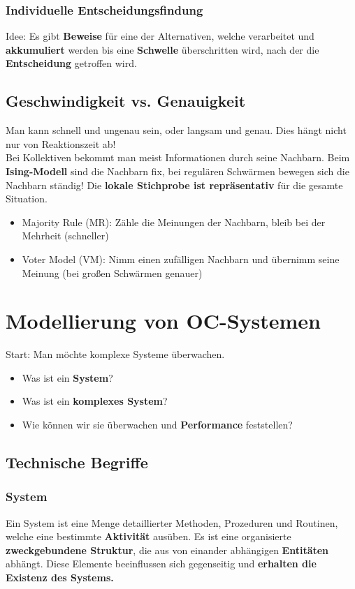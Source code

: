 \documentclass[a4paper]{article}
\begin{document}
\subsubsection{Individuelle Entscheidungsfindung}
Idee: Es gibt \textbf{Beweise} für eine der Alternativen, welche verarbeitet und \textbf{akkumuliert} werden bis eine \textbf{Schwelle} überschritten wird, nach der die \textbf{Entscheidung} getroffen wird.
\subsection{Geschwindigkeit vs. Genauigkeit}
Man kann schnell und ungenau sein, oder langsam und genau. Dies hängt nicht nur von Reaktionszeit ab!\\

Bei Kollektiven bekommt man meist Informationen durch seine Nachbarn. Beim \textbf{Ising-Modell} sind die Nachbarn fix, bei regulären Schwärmen bewegen sich die Nachbarn ständig! Die \textbf{lokale Stichprobe ist repräsentativ} für die gesamte Situation. 
\begin{itemize}
	\item Majority Rule (MR): Zähle die Meinungen der Nachbarn, bleib bei der Mehrheit (schneller)
	\item Voter Model (VM): Nimm einen zufälligen Nachbarn und übernimm seine Meinung (bei großen Schwärmen genauer)
\end{itemize}

\newpage
\section{Modellierung von OC-Systemen}
Start: Man möchte komplexe Systeme überwachen.
\begin{itemize}
	\item Was ist ein \textbf{System}?
	\item Was ist ein \textbf{komplexes System}?
	\item Wie können wir sie überwachen und \textbf{Performance} feststellen?
\end{itemize}
\subsection{Technische Begriffe}
\subsubsection{System}
Ein System ist eine Menge detaillierter Methoden, Prozeduren und Routinen, welche eine bestimmte \textbf{Aktivität} ausüben. Es ist eine organisierte \textbf{zweckgebundene Struktur}, die aus von einander abhängigen \textbf{Entitäten} abhängt. Diese Elemente beeinflussen sich gegenseitig und \textbf{erhalten die Existenz des Systems.}\\
\end{document}
